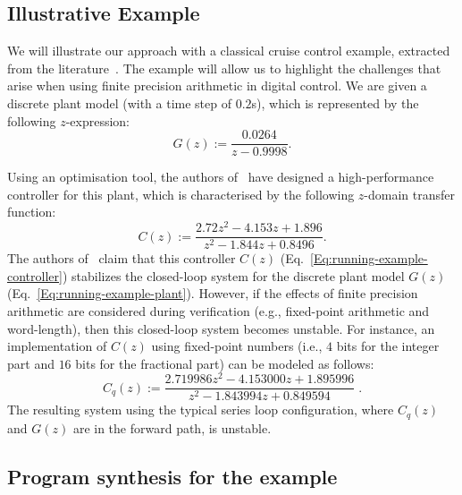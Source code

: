 \documentclass{sig-alternate-05-2015}
\begin{document}
\subsection{Illustrative Example} \label{sec:running-ex}

We will illustrate our approach with a classical cruise control example,
extracted from the literature~\cite{Astrom08}.  The example will allow us to
highlight the challenges that arise when using finite precision arithmetic
in digital control.  We are given a discrete plant model (with a time step
of $0.2$s), which is represented by the following $z$-expression:
%
\begin{equation}
\label{Eq:running-example-plant}
G\left(z\right) := \frac{0.0264}{z-0.9998}.
\end{equation}

Using an optimisation tool, the authors
of~\cite{DBLP:conf/hybrid/WangGRJF16} have designed a high-performance
controller for this plant, which is characterised by the following
$z$-domain transfer function:
%
\begin{equation}
\label{Eq:running-example-controller}
C\left(z\right) := \frac{2.72z^2 - 4.153z + 1.896}{z^2 - 1.844z + 0.8496}.
\end{equation}
%
The authors of~\cite{DBLP:conf/hybrid/WangGRJF16} claim that this controller
$C(z)$ (Eq.~\eqref{Eq:running-example-controller}) stabilizes the
closed-loop system for the discrete plant model $G(z)$
(Eq.~\ref{Eq:running-example-plant}).  However, if the effects of finite
precision arithmetic are considered during verification (e.g., fixed-point
arithmetic and word-length), then this closed-loop system becomes unstable.
%
For instance, an implementation of $C(z)$ using  fixed-point
numbers (i.e., $4$ bits for the integer part and $16$ bits for the
fractional part) can be modeled as follows:
%
\begin{equation}
\label{Eq:running-example-controller-quantised}
C_{q}\left(z\right) {:=} \frac{2.719986z^2{-}4.153000z
{+}1.895996}{z^2{-}1.843994z+0.849594} \;.
\end{equation} 
%
The resulting system using the typical series loop configuration, where
$C_{q}\left(z\right)$ and $G\left(z\right)$ are in the forward path, is
unstable.

\subsection{Program synthesis for the example}
\end{document}
